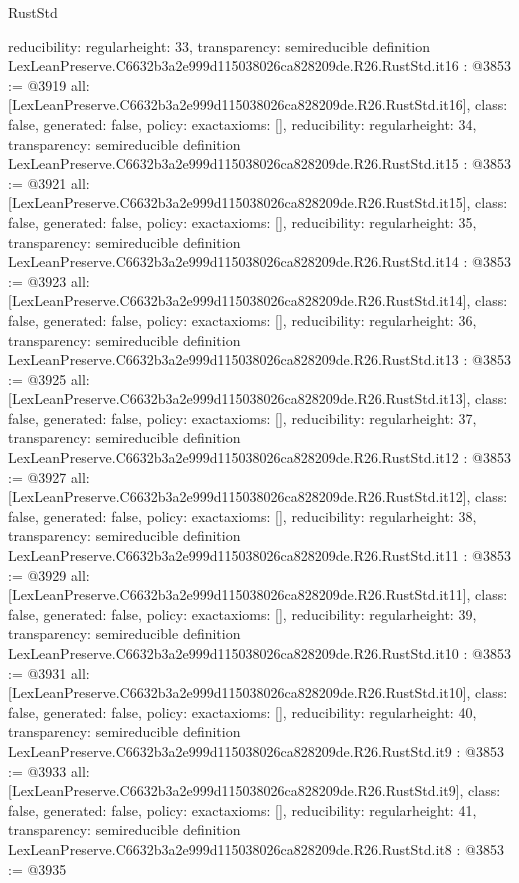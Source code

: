 \begin{lexlean}{RustStd}
\begin{coremodule}
{  reducibility: regular{height: 33},
  transparency: semireducible
}
definition LexLeanPreserve.C6632b3a2e999d115038026ca828209de.R26.RustStd.it16 : @3853 := @3919 {
  all: [LexLeanPreserve.C6632b3a2e999d115038026ca828209de.R26.RustStd.it16],
  class: false,
  generated: false,
  policy: exact{axioms: []},
  reducibility: regular{height: 34},
  transparency: semireducible
}
definition LexLeanPreserve.C6632b3a2e999d115038026ca828209de.R26.RustStd.it15 : @3853 := @3921 {
  all: [LexLeanPreserve.C6632b3a2e999d115038026ca828209de.R26.RustStd.it15],
  class: false,
  generated: false,
  policy: exact{axioms: []},
  reducibility: regular{height: 35},
  transparency: semireducible
}
definition LexLeanPreserve.C6632b3a2e999d115038026ca828209de.R26.RustStd.it14 : @3853 := @3923 {
  all: [LexLeanPreserve.C6632b3a2e999d115038026ca828209de.R26.RustStd.it14],
  class: false,
  generated: false,
  policy: exact{axioms: []},
  reducibility: regular{height: 36},
  transparency: semireducible
}
definition LexLeanPreserve.C6632b3a2e999d115038026ca828209de.R26.RustStd.it13 : @3853 := @3925 {
  all: [LexLeanPreserve.C6632b3a2e999d115038026ca828209de.R26.RustStd.it13],
  class: false,
  generated: false,
  policy: exact{axioms: []},
  reducibility: regular{height: 37},
  transparency: semireducible
}
definition LexLeanPreserve.C6632b3a2e999d115038026ca828209de.R26.RustStd.it12 : @3853 := @3927 {
  all: [LexLeanPreserve.C6632b3a2e999d115038026ca828209de.R26.RustStd.it12],
  class: false,
  generated: false,
  policy: exact{axioms: []},
  reducibility: regular{height: 38},
  transparency: semireducible
}
definition LexLeanPreserve.C6632b3a2e999d115038026ca828209de.R26.RustStd.it11 : @3853 := @3929 {
  all: [LexLeanPreserve.C6632b3a2e999d115038026ca828209de.R26.RustStd.it11],
  class: false,
  generated: false,
  policy: exact{axioms: []},
  reducibility: regular{height: 39},
  transparency: semireducible
}
definition LexLeanPreserve.C6632b3a2e999d115038026ca828209de.R26.RustStd.it10 : @3853 := @3931 {
  all: [LexLeanPreserve.C6632b3a2e999d115038026ca828209de.R26.RustStd.it10],
  class: false,
  generated: false,
  policy: exact{axioms: []},
  reducibility: regular{height: 40},
  transparency: semireducible
}
definition LexLeanPreserve.C6632b3a2e999d115038026ca828209de.R26.RustStd.it9 : @3853 := @3933 {
  all: [LexLeanPreserve.C6632b3a2e999d115038026ca828209de.R26.RustStd.it9],
  class: false,
  generated: false,
  policy: exact{axioms: []},
  reducibility: regular{height: 41},
  transparency: semireducible
}
definition LexLeanPreserve.C6632b3a2e999d115038026ca828209de.R26.RustStd.it8 : @3853 := @3935 {
}
\end{coremodule}
\end{lexlean}
